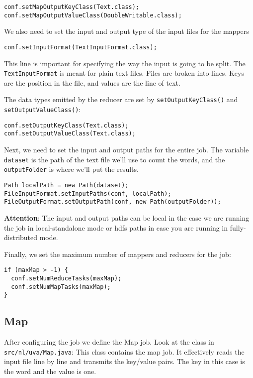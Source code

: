 \documentclass[a4paper,10pt]{article}
\begin{document}
\lstset{language=Java}      
\begin{lstlisting}
conf.setMapOutputKeyClass(Text.class);
conf.setMapOutputValueClass(DoubleWritable.class);
\end{lstlisting}

We also need to set the input and output type of the input files for the mappers 
\begin{lstlisting}
conf.setInputFormat(TextInputFormat.class);
\end{lstlisting}
This line is important for specifying the way the input is going to be split. The \texttt{TextInputFormat} is meant for plain text files. Files are broken into lines. Keys are the position in the file, and values are the line of text.


The data types emitted by the reducer are set by \texttt{setOutputKeyClass()} and \texttt{setOutputValueClass()}:

\begin{lstlisting}
conf.setOutputKeyClass(Text.class);
conf.setOutputValueClass(Text.class);
\end{lstlisting}       


Next, we need to set the input and output paths for the entire job. The variable \texttt{dataset} is the path of the text file we'll use to count the words, and the \texttt{outputFolder} is where we'll put the results. 

\begin{lstlisting}
Path localPath = new Path(dataset);
FileInputFormat.setInputPaths(conf, localPath);
FileOutputFormat.setOutputPath(conf, new Path(outputFolder));
\end{lstlisting}       

\textbf{Attention}: The input and output paths can be local in the case we are running the job in local-standalone mode or hdfs paths in case you are running in fully-distributed mode. 

Finally, we set the maximum number of mappers and reducers for the job:
\begin{lstlisting}
if (maxMap > -1) {
  conf.setNumReduceTasks(maxMap);
  conf.setNumMapTasks(maxMap);
}
\end{lstlisting}


\subsection{Map}

After configuring the job we define the Map job. Look at the class in \texttt{src/nl/uva/Map.java}: This class contains the map job. It effectively reads the input file line by line and transmits the key/value pairs. The key in this case is the word and the value is one.
% 
\end{document}
